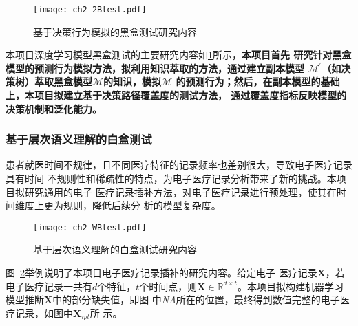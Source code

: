 \begin{figure}[htp]
    \begin{small}
        \begin{center}
            \texttt{[image: ch2\_2Btest.pdf]}
        \end{center}
        \caption{基于决策行为模拟的黑盒测试研究内容}
        \label{fig:ch2:2Btest}
    \end{small}
\end{figure}
本项目深度学习模型黑盒测试的主要研究内容如\cref{fig:ch2:2Btest}所示，\textbf{本项目首先
研究针对黑盒模型的预测行为模拟方法，拟利用知识萃取的方法，通过建立副本模型
$\mathcal M^\prime$（如决策树）萃取黑盒模型$\mathcal M$的知识，模拟$\mathcal M$
的预测行为；然后，在副本模型的基础上，本项目拟建立基于决策路径覆盖度的测试方法，
通过覆盖度指标反映模型的决策机制和泛化能力。}

\subsubsection{基于层次语义理解的白盒测试}


患者就医时间不规律，且不同医疗特征的记录频率也差别很大，导致电子医疗记录具有时间
不规则性和稀疏性的特点，为电子医疗记录分析带来了新的挑战。本项目拟研究通用的电子
医疗记录插补方法，对电子医疗记录进行预处理，使其在时间维度上更为规则，降低后续分
析的模型复杂度。

\begin{figure}[htp]
    \begin{small}
        \begin{center}
            \texttt{[image: ch2\_WBtest.pdf]}
        \end{center}
        \caption{基于层次语义理解的白盒测试研究内容}
        \label{fig:ch2:WBtest}
    \end{small}
\end{figure}

图~\ref{fig:ch2:WBtest}举例说明了本项目电子医疗记录插补的研究内容。给定电子
医疗记录$\bm X$，若电子医疗记录一共有$d$个特征，$t$个时间点，则$\bm X \in
\mathbb{R}^{d\times t}$。本项目拟构建机器学习模型推断$\bm X$中的部分缺失值，即图
中\textit{NA}所在的位置，最终得到数值完整的电子医疗记录，如图中$\bm X_{ipt}$所
示。

